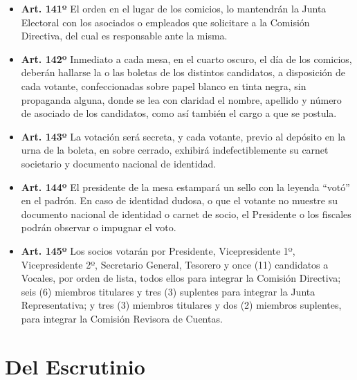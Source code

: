 \documentclass[openany]{book}
\providecommand{\tightlist}{%
  \setlength{\itemsep}{0pt}\setlength{\parskip}{0pt}}
\begin{document}
\begin{itemize}
\tightlist
\item
  \textbf{Art. 141º}
  El orden en el lugar de los comicios, lo mantendrán la Junta Electoral con los asociados o empleados que solicitare a la Comisión Directiva, del cual es responsable ante la misma.
\end{itemize}

\begin{itemize}
\tightlist
\item
  \textbf{Art. 142º}
  Inmediato a cada mesa, en el cuarto oscuro, el día de los comicios, deberán hallarse la o las boletas de los distintos candidatos, a disposición de cada votante, confeccionadas sobre papel blanco en tinta negra, sin propaganda alguna, donde se lea con claridad el nombre, apellido y número de asociado de los candidatos, como así también el cargo a que se postula.
\end{itemize}

\begin{itemize}
\tightlist
\item
  \textbf{Art. 143º}
  La votación será secreta, y cada votante, previo al depósito en la urna de la boleta, en sobre cerrado, exhibirá indefectiblemente su carnet societario y documento nacional de identidad.
\end{itemize}

\begin{itemize}
\tightlist
\item
  \textbf{Art. 144º}
  El presidente de la mesa estampará un sello con la leyenda ``votó'' en el padrón. En caso de identidad dudosa, o que el votante no muestre su documento nacional de identidad o carnet de socio, el Presidente o los fiscales podrán observar o impugnar el voto.
\end{itemize}

\begin{itemize}
\tightlist
\item
  \textbf{Art. 145º}
  Los socios votarán por Presidente, Vicepresidente 1º, Vicepresidente 2º, Secretario General, Tesorero y once (11) candidatos a Vocales, por orden de lista, todos ellos para integrar la Comisión Directiva; seis (6) miembros titulares y tres (3) suplentes para integrar la Junta Representativa; y tres (3) miembros titulares y dos (2) miembros suplentes, para integrar la Comisión Revisora de Cuentas.
\end{itemize}

\hypertarget{del-escrutinio}{%
\section{Del Escrutinio}\label{del-escrutinio}}
\end{document}
